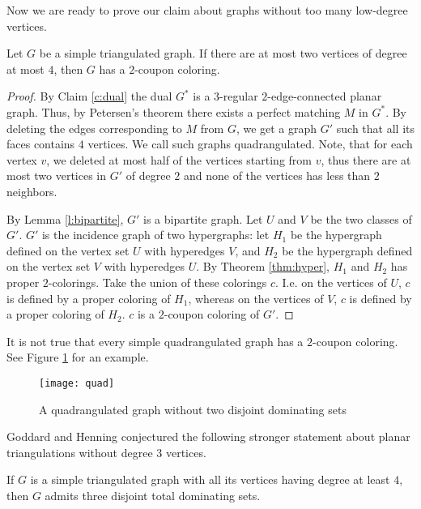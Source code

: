 Now we are ready to prove our claim about graphs without too many low-degree vertices.

\begin{claim}
  Let $G$ be a simple triangulated graph. If there are at most two vertices of degree
  at most $4$, then $G$ has a $2$-coupon coloring.
\end{claim}
\begin{proof}
  By Claim \ref{c:dual} the dual $G^*$ is a $3$-regular $2$-edge-connected planar graph.
  Thus, by Petersen's theorem there exists a perfect matching $M$ in $G^*$. By deleting
  the edges corresponding to $M$ from $G$, we get a graph $G'$ such that all its faces contains
  $4$ vertices. We call such graphs quadrangulated. Note, that for each vertex $v$,
  we deleted at most half of the vertices starting from $v$, thus there are at most
  two vertices in $G'$ of degree $2$ and none of the vertices has less than $2$ neighbors.

  By Lemma \ref{l:bipartite}, $G'$
  is a bipartite graph. Let $U$ and $V$ be the two classes of $G'$. $G'$ is the incidence
  graph of two hypergraphs: let $H_1$ be the hypergraph defined on the vertex set
  $U$ with hyperedges $V$, and $H_2$ be the hypergraph defined on the vertex set $V$
  with hyperedges $U$. By Theorem \ref{thm:hyper}, $H_1$ and $H_2$ has proper $2$-colorings.
  Take the union of these colorings $c$. I.e. on the vertices of $U$, $c$ is defined
  by a proper coloring of $H_1$, whereas on the vertices of $V$, $c$ is defined
  by a proper coloring of $H_2$. $c$ is a $2$-coupon coloring of $G'$.
\end{proof}

\begin{remark}
  It is not true that every simple quadrangulated graph has a $2$-coupon coloring.
  See Figure \ref{fig:quad} for an example.
\end{remark}
\begin{figure}[ht]
  \centering
  \texttt{[image: quad]}
  \caption{A quadrangulated graph without two disjoint dominating sets}
  \label{fig:quad}
\end{figure}

Goddard and Henning \cite{gh} conjectured the following stronger statement about
planar triangulations without degree $3$ vertices.

\begin{conj}
  If $G$ is a simple triangulated graph with all its vertices having degree at least
  $4$, then $G$ admits three disjoint total dominating sets.
\end{conj}

